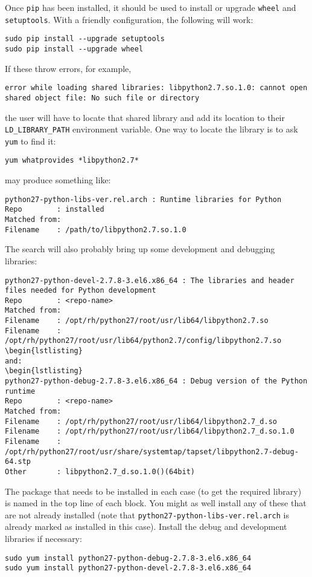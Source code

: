 Once \verb|pip| has been installed, it should be used 
to install or upgrade \verb|wheel| and \verb|setuptools|.
With a friendly configuration, the following will work:
\begin{lstlisting}
sudo pip install --upgrade setuptools 
sudo pip install --upgrade wheel 
\end{lstlisting}

If these throw errors, for example,
\begin{lstlisting}
error while loading shared libraries: libpython2.7.so.1.0: cannot open shared object file: No such file or directory
\end{lstlisting}
the user will have to locate that shared library 
and add its location to their \verb|LD_LIBRARY_PATH| environment variable.
One way to locate the library is to ask \verb|yum| to find it:
\begin{lstlisting}
yum whatprovides *libpython2.7*
\end{lstlisting}
may produce something like:
\begin{lstlisting}
python27-python-libs-ver.rel.arch : Runtime libraries for Python
Repo        : installed
Matched from:
Filename    : /path/to/libpython2.7.so.1.0
\end{lstlisting}
The search will also probably bring up some development and debugging libraries:
\begin{lstlisting}
python27-python-devel-2.7.8-3.el6.x86_64 : The libraries and header files needed for Python development
Repo        : <repo-name> 
Matched from:
Filename    : /opt/rh/python27/root/usr/lib64/libpython2.7.so
Filename    : /opt/rh/python27/root/usr/lib64/python2.7/config/libpython2.7.so
\begin{lstlisting}
and:
\begin{lstlisting}
python27-python-debug-2.7.8-3.el6.x86_64 : Debug version of the Python runtime
Repo        : <repo-name> 
Matched from:
Filename    : /opt/rh/python27/root/usr/lib64/libpython2.7_d.so
Filename    : /opt/rh/python27/root/usr/lib64/libpython2.7_d.so.1.0
Filename    : /opt/rh/python27/root/usr/share/systemtap/tapset/libpython2.7-debug-64.stp
Other       : libpython2.7_d.so.1.0()(64bit)
\end{lstlisting}
The package that needs to be installed in each case 
(to get the required library)
is named in the top line of each block.
You might as well install any of these
that are not already installed
(note that \verb|python27-python-libs-ver.rel.arch|
is already marked as installed in this case).
Install the debug and development libraries if necessary:
\begin{lstlisting}
sudo yum install python27-python-debug-2.7.8-3.el6.x86_64
sudo yum install python27-python-devel-2.7.8-3.el6.x86_64
\end{lstlisting}

